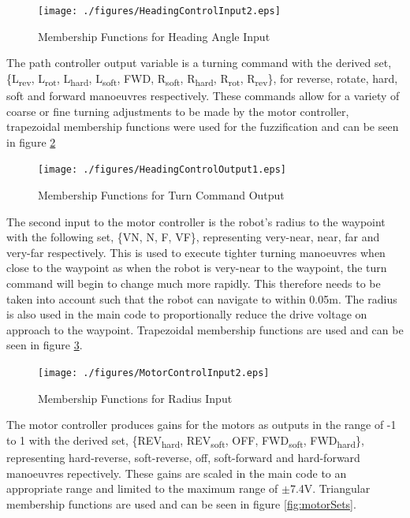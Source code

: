 \documentclass[10pt]{article}
\begin{document}
\begin{figure}[H]
    \centering
\texttt{[image: ./figures/HeadingControlInput2.eps]}
\caption{Membership Functions for Heading Angle Input}
\label{fig:headingSets}
\end{figure}

The path controller output variable is a turning command with the derived set, 
\{L\textsubscript{rev}, L\textsubscript{rot}, L\textsubscript{hard}, L\textsubscript{soft}, FWD, R\textsubscript{soft}, R\textsubscript{hard}, R\textsubscript{rot}, R\textsubscript{rev}\},
for reverse, rotate, hard, soft and forward manoeuvres respectively. 
These commands allow for a variety of coarse or fine turning adjustments to be made by the motor controller, trapezoidal membership functions were used for the fuzzification and can be seen in figure \ref{fig:commandSets}
\begin{figure}[H]
    \centering
\texttt{[image: ./figures/HeadingControlOutput1.eps]}
\caption{Membership Functions for Turn Command Output}
\label{fig:commandSets}
\end{figure}

The second input to the motor controller is the robot's radius to the waypoint with the following set, \{VN, N, F, VF\}, representing very-near, near, far and very-far respectively.
This is used to execute tighter turning manoeuvres when close to the waypoint as when the robot is very-near to the waypoint, the turn command will begin to change much more rapidly.
This therefore needs to be taken into account such that the robot can navigate to within 0.05m.
The radius is also used in the main code to proportionally reduce the drive voltage on approach to the waypoint.
Trapezoidal membership functions are used and can be seen in figure \ref{fig:radiusSets}.

\begin{figure}[H]
    \centering
\texttt{[image: ./figures/MotorControlInput2.eps]}
\caption{Membership Functions for Radius Input}
\label{fig:radiusSets}
\end{figure}

The motor controller produces gains for the motors as outputs in the range of -1 to 1 with the derived set, \{REV\textsubscript{hard}, REV\textsubscript{soft}, OFF, FWD\textsubscript{soft}, FWD\textsubscript{hard}\},
representing hard-reverse, soft-reverse, off, soft-forward and hard-forward manoeuvres repectively. 
These gains are scaled in the main code to an appropriate range and limited to the maximum range of $\pm$7.4V. 
Triangular membership functions are used and can be seen in figure \ref{fig:motorSets}.
\end{document}
